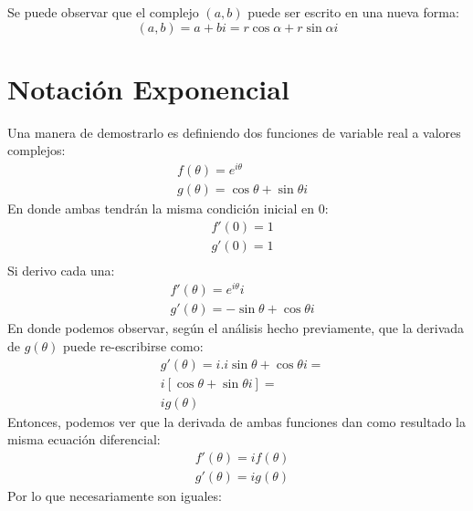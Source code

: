 \documentclass[12pt, twocolumn]{article}
\begin{document}
Se puede observar que el complejo $(a,b)$ puede ser escrito en una nueva forma:
$$(a,b)=a+bi=\boxed{r\cos{\alpha}+r\sin{\alpha}i}$$

\section{Notación Exponencial}
Una manera de demostrarlo es definiendo dos funciones de variable real a valores complejos:
\begin{equation*}
    \begin{aligned}
        &f(\theta)=e^{i\theta}\\
        &g(\theta)=\cos{\theta}+\sin{\theta}i
    \end{aligned}
\end{equation*}
En donde ambas tendrán la misma condición inicial en 0:
\begin{equation*}
    \begin{aligned}
        &f'(0)=1\\
        &g'(0)=1\\
    \end{aligned}
\end{equation*}
Si derivo cada una:
\begin{equation*}
    \begin{aligned}
        &f'(\theta)=e^{i\theta}i\\
        &g'(\theta)=-\sin{\theta}+\cos{\theta}i
    \end{aligned}
\end{equation*}
En donde podemos observar, según el análisis hecho previamente, que la derivada de $g(\theta)$ puede re-escribirse como:
\begin{equation*}
    \begin{aligned}
        &g'(\theta)=i.i\sin{\theta}+\cos{\theta}i=\\
        &i[\cos{\theta}+\sin{\theta}i]=\\    
        &ig(\theta)
    \end{aligned}
\end{equation*}  
Entonces, podemos ver que la derivada de ambas funciones dan como resultado la misma ecuación diferencial:
\begin{equation*}
    \begin{aligned}
        &f'(\theta)=if(\theta)\\
        &g'(\theta)=ig(\theta)     
    \end{aligned}
\end{equation*} 
Por lo que necesariamente son iguales:
\end{document}
